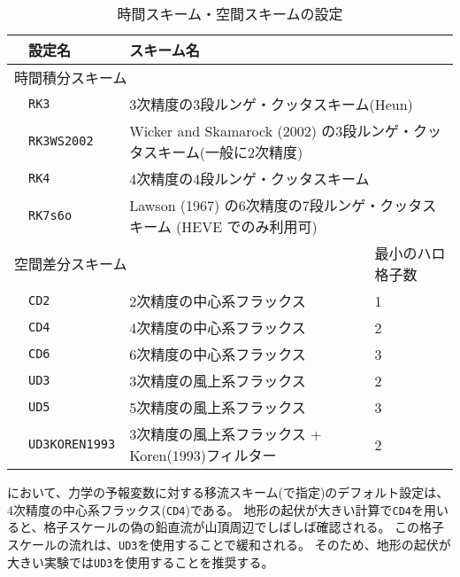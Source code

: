 \begin{table}[h]
\begin{center}
  \caption{時間スキーム・空間スキームの設定}
  \label{tab:nml_atm_dyn}
  \begin{tabularx}{150mm}{llXX} \hline
    \rowcolor[gray]{0.9} & \multicolumn{1}{l}{設定名} & \multicolumn{1}{l}{スキーム名} & \\ \hline
    \multicolumn{3}{l}{時間積分スキーム} &  \\ \hline
    & \multicolumn{1}{l}{\verb|RK3|} & \multicolumn{2}{l}{3次精度の3段ルンゲ・クッタスキーム(Heun)} \\
    & \multicolumn{1}{l}{\verb|RK3WS2002|} & \multicolumn{2}{l}{Wicker and Skamarock (2002) の3段ルンゲ・クッタスキーム(一般に2次精度)} \\
    & \multicolumn{1}{l}{\verb|RK4|} & \multicolumn{2}{l}{4次精度の4段ルンゲ・クッタスキーム} \\
    & \multicolumn{1}{l}{\verb|RK7s6o|} & \multicolumn{2}{l}{Lawson (1967) の6次精度の7段ルンゲ・クッタスキーム (HEVE でのみ利用可) } \\
    \hline
    \multicolumn{3}{l}{空間差分スキーム} & 最小のハロ格子数\\ \hline
    & \multicolumn{1}{l}{\verb|CD2|} & \multicolumn{1}{l}{2次精度の中心系フラックス} & \multicolumn{1}{l}{1}\\
    & \multicolumn{1}{l}{\verb|CD4|} & \multicolumn{1}{l}{4次精度の中心系フラックス} & \multicolumn{1}{l}{2}\\
    & \multicolumn{1}{l}{\verb|CD6|} & \multicolumn{1}{l}{6次精度の中心系フラックス} & \multicolumn{1}{l}{3}\\
    & \multicolumn{1}{l}{\verb|UD3|} & \multicolumn{1}{l}{3次精度の風上系フラックス} & \multicolumn{1}{l}{2}\\
    & \multicolumn{1}{l}{\verb|UD5|} & \multicolumn{1}{l}{5次精度の風上系フラックス} & \multicolumn{1}{l}{3}\\
    & \multicolumn{1}{l}{\verb|UD3KOREN1993|} & \multicolumn{1}{X}{3次精度の風上系フラックス + Koren(1993)フィルター} & \multicolumn{1}{l}{2}\\
\hline
  \end{tabularx}
\end{center}
\end{table}

\scalerm において、力学の予報変数に対する移流スキーム(で指定)のデフォルト設定は、
4次精度の中心系フラックス(\verb|CD4|)である。
地形の起伏が大きい計算で\verb|CD4|を用いると、格子スケールの偽の鉛直流が山頂周辺でしばしば確認される。
この格子スケールの流れは、\verb|UD3|を使用することで緩和される。
そのため、地形の起伏が大きい実験では\verb|UD3|を使用することを推奨する。

